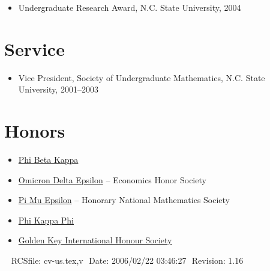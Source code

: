 \documentclass[overlapped,line,final,11pt,letterpaper]{res}
\def\Cplusplus{{\rm C\raise.5ex\hbox{\small ++}}}
\begin{document}
\begin{resume}
\begin{itemize}
\item Undergraduate Research Award, N.C. State University, 2004
\end{itemize}


\section{\bf Service}

\begin{itemize}
\item Vice President, Society of Undergraduate Mathematics, N.C. State
  University, 2001--2003
\end{itemize}


\section{\bf Honors}
\begin{itemize}
\item \href{http://www.pbk.org/}{Phi Beta Kappa}
\item \href{http://www.cba.ua.edu/~ode/}
  {Omicron Delta Epsilon} -- Economics Honor Society
\item \href{http://www.pme-math.org/}
  {Pi Mu Epsilon} -- Honorary National Mathematics Society
\item \href{http://www.phikappaphi.org/}{Phi Kappa Phi}
\item \href{http://www.goldenkey.org}{Golden Key International Honour Society}
\end{itemize}




\begin{center}
\vspace{\fill}\ \newline
{\tiny \rm $ $RCSfile: cv-us.tex,v $ $ }
{\tiny \rm $ $Date: 2006/02/22 03:46:27 $ $ }
{\tiny \rm $ $Revision: 1.16 $ $ }
\end{center}

\end{resume}
\end{document}
